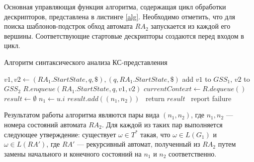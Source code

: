 %	
%			

Основная управляющая функция алгоритма, содержащая цикл обработки дескрипторов, представлена в листинге \ref{alg}. Необходимо отметить, что для поиска шаблонов-подстрок обход автомата $RA_2$ запускается из каждой его вершины. Соответствующие стартовые дескрипторы создаются перед входом в цикл.

\begin{algorithm}[H]
\begin{algorithmic}
\caption{Алгоритм синтаксического анализа КС-представления}
		\State $v1, v2 \gets (RA_1.StartState, q, \$), (q, RA_1.StartState, \$)$
		\State add $v1$ to $GSS_1$, $v2$ to $GSS_2$
		\State $R.enqueue(RA_1.StartState, q, v1, v2)$
	\EndFor
		\State $currentContext \gets R.dequeue()$
		\State {}
		\State {}
	\EndWhile
	\State $result \gets \emptyset$
		\State $n_1 \gets u.i$  
		\State $result.add((n_1, n_2))$
	\EndFor
	\ return $result$
	\Else
	\ report failure
	\EndIf
\EndFunction
\label{alg}
\end{algorithmic}
\end{algorithm}

Результатом работы алгоритма являются пары вида $(n_1, n_2)$, где $n_1, n_2$ --- номера состояний автомата $RA_2$. 
Для каждой из таких пар выполняется следующее утверждение: существует $ \omega \in T^*$ такая, что $\omega \in L(G_1)$ и $\omega \in L(RA')$, где $RA'$ --- рекурсивный автомат, полученный из $RA_2$ путем замены начального и конечного состояний на $n_1$ и $n_2$ соответственно.
